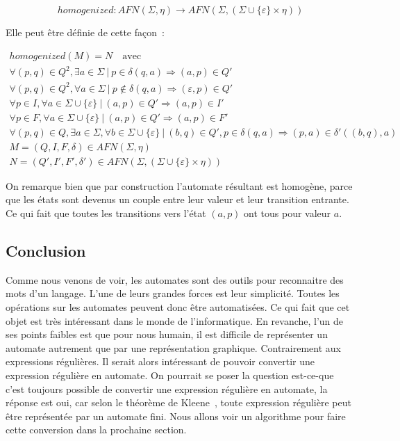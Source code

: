 \[
    homogenized: AFN(\Sigma, \eta) \to AFN(\Sigma, (\Sigma \cup \{\varepsilon\} \times \eta))
\]

Elle peut être définie de cette façon~:

\begin{gather*}
    homogenized(M) = N \quad \text{avec}                                                          \\
    \forall (p, q) \in Q^2, \exists a \in \Sigma ~|~ p \in \delta(q, a) \Rightarrow (a, p) \in Q' \\
    \forall (p, q) \in Q^2, \forall a \in \Sigma ~|~ p \notin \delta(q, a)
    \Rightarrow (\varepsilon, p) \in Q' \\
    \forall p \in I, \forall a \in \Sigma \cup \{\varepsilon\} ~|~ (a, p) \in Q' \Rightarrow (a, p) \in I' \\
    \forall p \in F, \forall a \in \Sigma \cup \{\varepsilon\} ~|~ (a, p) \in Q' \Rightarrow (a, p) \in F' \\
    \forall (p, q) \in Q, \exists a \in \Sigma, \forall b \in \Sigma \cup \{\varepsilon\} ~|~ (b, q) \in Q', p \in \delta(q, a) \Rightarrow (p, a) \in \delta'((b, q), a) \\
    M = (Q, I, F, \delta) \in AFN(\Sigma, \eta) \\
    N = (Q', I', F', \delta') \in AFN(\Sigma, (\Sigma \cup \{\varepsilon\}
    \times \eta))
\end{gather*}

On remarque bien que par construction l'automate résultant est homogène, parce
que les états sont devenus un couple entre leur valeur et leur transition
entrante. Ce qui fait que toutes les transitions vers l'état \((a, p)\) ont
tous pour valeur \(a\).

\subsection{Conclusion}

Comme nous venons de voir, les automates sont des outils pour reconnaitre des
mots d'un langage. L'une de leurs grandes forces est leur simplicité. Toutes
les opérations sur les automates peuvent donc être automatisées. Ce qui fait
que cet objet est très intéressant dans le monde de l'informatique. En
revanche, l'un de ses points faibles est que pour nous humain, il est difficile
de représenter un automate autrement que par une représentation graphique.
Contrairement aux expressions régulières. Il serait alors intéressant de
pouvoir convertir une expression régulière en automate. On pourrait se poser la
question \og{}est-ce-que c'est toujours possible de convertir une expression
régulière en automate\fg{}, la réponse est oui, car selon le théorème de
Kleene~\cite{Kleene1951RepresentationOE}, toute expression régulière peut être
représentée par un automate fini. Nous allons voir un algorithme pour faire
cette conversion dans la prochaine section.
